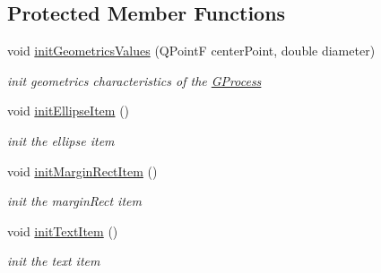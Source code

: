 \subsection*{Protected Member Functions}
\begin{DoxyCompactItemize}
\item 
void \hyperlink{classGProcess_a8c0a68a9aa30e5233f4bb19f4d8fdcce}{init\+Geometrics\+Values} (Q\+Point\+F center\+Point, double diameter)
\begin{DoxyCompactList}\small\item\em init geometrics characteristics of the \hyperlink{classGProcess}{G\+Process} \end{DoxyCompactList}\item 
\hypertarget{classGProcess_a69e373076c707aca9848cdd9bfc0cbe0}{void \hyperlink{classGProcess_a69e373076c707aca9848cdd9bfc0cbe0}{init\+Ellipse\+Item} ()}\label{classGProcess_a69e373076c707aca9848cdd9bfc0cbe0}

\begin{DoxyCompactList}\small\item\em init the ellipse item \end{DoxyCompactList}\item 
\hypertarget{classGProcess_a8e33860abac2659ec14754133f574663}{void \hyperlink{classGProcess_a8e33860abac2659ec14754133f574663}{init\+Margin\+Rect\+Item} ()}\label{classGProcess_a8e33860abac2659ec14754133f574663}

\begin{DoxyCompactList}\small\item\em init the margin\+Rect item \end{DoxyCompactList}\item 
\hypertarget{classGProcess_a8bc107d304dad64083ae5e3974c0e824}{void \hyperlink{classGProcess_a8bc107d304dad64083ae5e3974c0e824}{init\+Text\+Item} ()}\label{classGProcess_a8bc107d304dad64083ae5e3974c0e824}

\begin{DoxyCompactList}\small\item\em init the text item \end{DoxyCompactList}\end{DoxyCompactItemize}
